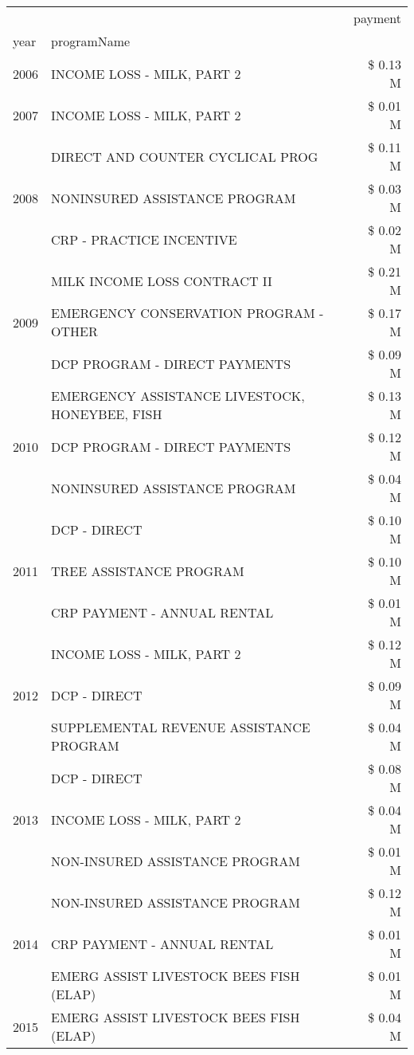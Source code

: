 \begin{tabular}{llr}
\toprule
 &  & payment \\
year & programName &  \\
\midrule
2006 & INCOME LOSS - MILK, PART 2 & \$ 0.13 M \\
\cline{1-3}
2007 & INCOME LOSS - MILK, PART 2 & \$ 0.01 M \\
\cline{1-3}
\multirow[t]{3}{*}{2008} & DIRECT AND COUNTER CYCLICAL PROG & \$ 0.11 M \\
 & NONINSURED ASSISTANCE PROGRAM & \$ 0.03 M \\
 & CRP - PRACTICE INCENTIVE & \$ 0.02 M \\
\cline{1-3}
\multirow[t]{3}{*}{2009} & MILK INCOME LOSS CONTRACT II & \$ 0.21 M \\
 & EMERGENCY CONSERVATION PROGRAM - OTHER & \$ 0.17 M \\
 & DCP PROGRAM - DIRECT PAYMENTS & \$ 0.09 M \\
\cline{1-3}
\multirow[t]{3}{*}{2010} & EMERGENCY ASSISTANCE LIVESTOCK, HONEYBEE, FISH & \$ 0.13 M \\
 & DCP PROGRAM - DIRECT PAYMENTS & \$ 0.12 M \\
 & NONINSURED ASSISTANCE PROGRAM & \$ 0.04 M \\
\cline{1-3}
\multirow[t]{3}{*}{2011} & DCP - DIRECT & \$ 0.10 M \\
 & TREE ASSISTANCE PROGRAM & \$ 0.10 M \\
 & CRP PAYMENT - ANNUAL RENTAL & \$ 0.01 M \\
\cline{1-3}
\multirow[t]{3}{*}{2012} & INCOME LOSS - MILK, PART 2 & \$ 0.12 M \\
 & DCP - DIRECT & \$ 0.09 M \\
 & SUPPLEMENTAL REVENUE ASSISTANCE PROGRAM & \$ 0.04 M \\
\cline{1-3}
\multirow[t]{3}{*}{2013} & DCP - DIRECT & \$ 0.08 M \\
 & INCOME LOSS - MILK, PART 2 & \$ 0.04 M \\
 & NON-INSURED ASSISTANCE PROGRAM & \$ 0.01 M \\
\cline{1-3}
\multirow[t]{3}{*}{2014} & NON-INSURED ASSISTANCE PROGRAM & \$ 0.12 M \\
 & CRP PAYMENT - ANNUAL RENTAL & \$ 0.01 M \\
 & EMERG ASSIST LIVESTOCK BEES FISH (ELAP) & \$ 0.01 M \\
\cline{1-3}
\multirow[t]{3}{*}{2015} & EMERG ASSIST LIVESTOCK BEES FISH (ELAP) & \$ 0.04 M \\

\end{tabular}

